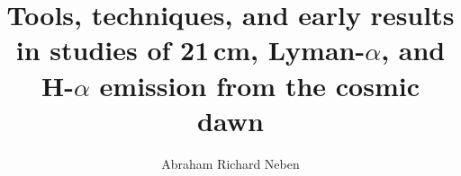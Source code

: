 % 
% 
%
%
%
%
%
%
%
% 
% 

\title{Tools, techniques, and early results in studies of 21\,cm, Lyman-$\alpha$, and H-$\alpha$ emission from the cosmic dawn}

\author{Abraham Richard Neben}


